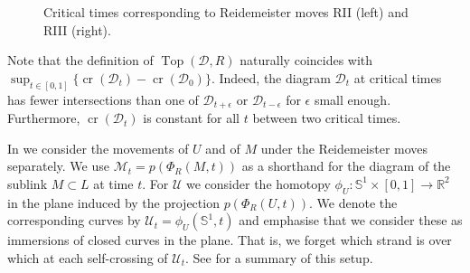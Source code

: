 \documentclass[10pt,a4paper]{amsart}
\newcommand{\R}{\mathbb{R}}
\newcommand{\Sp}{\mathbb{S}}
\newcommand{\control}[2]{ ($#2+#1$) .. #1}
\newcommand{\cross}{\operatorname{cr}}
\newcommand{\addcross}{\operatorname{Top}}
\begin{document}
\begin{figure}[ht]
\begin{center}
\caption{Critical times corresponding to Reidemeister moves RII (left) and RIII (right).}
\label{pic_def_critic}
\end{center}
\end{figure}

Note that the definition of $\addcross(\mathcal{D},R)$ naturally coincides with $\sup_{t\in [0,1]} \{\cross(\mathcal{D}_t) - \cross(\mathcal{D}_0)\} $. Indeed, the diagram $\mathcal{D}_t$ at critical times has fewer intersections than one of $\mathcal{D}_{t+ \epsilon }$ or $\mathcal{D}_{t- \epsilon }$ for $\epsilon$ small enough. Furthermore, $\cross(\mathcal{D}_t)$ is constant for all $t$ between two critical times.

In  we consider the movements of $U$ and of $M$ under the Reidemeister moves separately. 
We use $\mathcal{M}_t = p(\Phi_R(M,t))$ as a shorthand for the diagram of the sublink $M\subset L$ at time $t$. For $\mathcal{U}$ we consider the homotopy $\phi_U: \mathbb{S}^1 \times [0,1] \rightarrow \R^2$ in the plane induced by the projection $p(\Phi_R(U,t))$. We denote the corresponding curves by $\mathcal{U}_t=\phi_U(\Sp^1,t)$ and emphasise that we consider these as immersions of closed curves in the plane. That is, we forget which strand is over which at each self-crossing of $\mathcal{U}_t$. See  for a summary of this setup.
\end{document}

